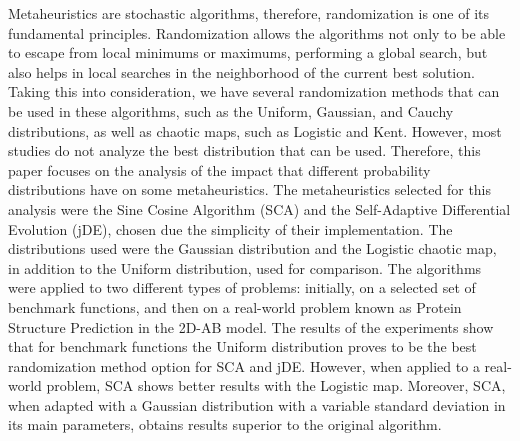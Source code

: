 Metaheuristics are stochastic algorithms, therefore, randomization is one of its fundamental principles. Randomization allows the algorithms not only to be able to escape from local minimums or maximums, performing a global search, but also helps in local searches in the neighborhood of the current best solution. Taking this into consideration, we have several randomization methods that can be used in these algorithms, such as the Uniform, Gaussian, and Cauchy distributions, as well as chaotic maps, such as Logistic and Kent. However, most studies do not analyze the best distribution that can be used. Therefore, this paper focuses on the analysis of the impact that different probability distributions have on some metaheuristics. The metaheuristics selected for this analysis were the Sine Cosine Algorithm (SCA) and the Self-Adaptive Differential Evolution (jDE), chosen due the simplicity of their implementation. The distributions used were the Gaussian distribution and the Logistic chaotic map, in addition to the Uniform distribution, used for comparison. The algorithms were applied to two different types of problems: initially, on a selected set of benchmark functions, and then on a real-world problem known as Protein Structure Prediction in the 2D-AB model. The results of the experiments show that for benchmark functions the Uniform distribution proves to be the best randomization method option for SCA and jDE. However, when applied to a real-world problem, SCA shows better results with the Logistic map. Moreover, SCA, when adapted with a Gaussian distribution with a variable standard deviation in its main parameters, obtains results superior to the original algorithm.
